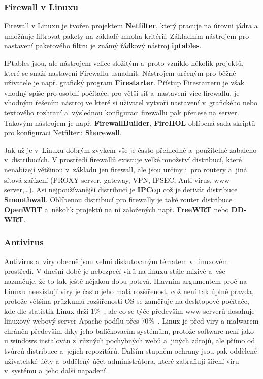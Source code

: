 \documentclass[a4paper,12pt]{article}
\renewcommand{\b}[1]{\textbf{#1}} %
\begin{document}
\subsubsection{Firewall v Linuxu}

Firewall v Linuxu je tvořen projektem \b{Netfilter}, který pracuje na úrovni jádra a umožňuje filtrovat pakety na základě mnoha kritérií. Základním nástrojem pro nastavení paketového filtru je známý řádkový nástroj \b{iptables}.~\cite{FirewallNetfilter}

IPtables jsou, ale nástrojem velice složitým a~proto vzniklo několik projektů, které se snaží nastavení Firewallu usnadnit. Nástrojem určeným pro běžné uživatele je např. grafický program \b{Firestarter}. Přístup Firestarteru je však vhodný spíše pro osobní počítače, pro větší síť a~nastavení více firewallů, je vhodným řešením nástroj ve které si uživatel vytvoří nastavení v~grafického nebo textového rozhraní a~výslednou konfiguraci firewallu pak přenese na server. Takovým nástrojem je např. \b{FirewallBuilder}, \b{FireHOL} oblíbená sada skriptů pro konfiguraci Netfilteru \b{Shorewall}.

Jak už je v~Linuxu dobrým zvykem vše je často přehledně a~použitelně zabaleno v~distribucích. V prostředí firewallů existuje velké množství distribucí, které nenabízejí většinou v~základu jen firewall, ale jsou určiny i~pro routery a~jiná síťová zařízení (PROXY server, gateway, VPN, IPSEC, Anti-virus, www server,…). Asi nejpoužívanější distribucí je \b{IPCop} což je derivát distribuce \b{Smoothwall}. Oblíbenou distribucí pro firewally je také router distribuce \b{OpenWRT} a~několik projektů na ní založených např. \b{FreeWRT} nebo \b{DD-WRT}.

\subsubsection{Antivirus}\label{sec:antivirus}

Antivirus a~viry obecně jsou velmi diskutovaným tématem v~linuxovém prostředí. V dnešní době je nebezpečí virů na linuxu stále mizivé a~vše naznačuje, že to tak ještě nějakou dobu potrvá. Hlavním argumentem proč na Linuxu neexistují viry je často jeho malá rozšířenost, což není tak úplně pravda, protože většina průzkumů rozšířenosti OS se zaměřuje na desktopové počítače, kde dle statistik Linux drží 1\%~\cite{StatistikaOS}, ale co se týče především www serverů dosahuje linuxový webový server Apache podílu přes 70\%~\cite{StatLinuxWebServer}. Linux je před viry a malwarem chráněn především díky jeho balíčkovacím systémům, protože software není jako u windows instalován z~různých pochybných webů a~jiných zdrojů, ale přímo od tvůrců distribuce a~jejich repozitářů. Dalším stupněm ochrany jsou pak oddělené uživatelské účty a~oddělený účet administrátora, které zabraňují šíření viru v~systému a~jeho další napadení.~\cite{LinuxCZviry}
\end{document}
